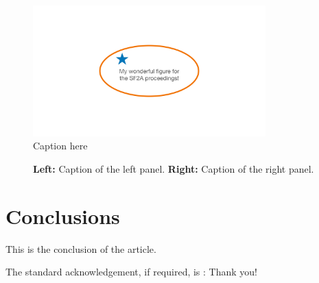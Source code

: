 \documentclass{sf2a-conf2023}
\begin{document}
\begin{figure}[ht!]
 \centering
 \includegraphics[width=0.8\textwidth,clip]{author_fig1}      
  \caption{Caption here}
  \label{author1:fig1}
\end{figure}

\begin{figure}[ht!]
 \centering
  \caption{{\bf Left:} Caption of the left panel. {\bf Right:} Caption of the right panel. }
  \label{author1:fig2}
\end{figure}

\section{Conclusions}

This is the conclusion of the article.

\begin{acknowledgements}
The standard acknowledgement, if required, is : Thank you!
\end{acknowledgements}

\end{document}

